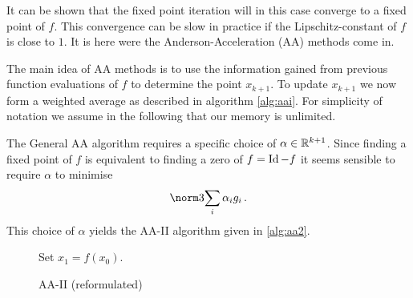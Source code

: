 It can be shown that the fixed point iteration will in this case converge to a fixed point of $f$. This convergence can be slow in practice if the Lipschitz-constant of $f$ is close to $1$. It is here were the Anderson-Acceleration (AA) methods come in.

The main idea of AA methods is to use the information gained from previous function evaluations of $f$ to determine the point $x_{k+1}$. To update $x_{k+1}$ we now form a weighted average as described in algorithm \ref{alg:aai}. For simplicity of notation we assume in the following that our memory is unlimited.

The General AA algorithm requires a specific choice of $\alpha\in\mathbb{R}^{k+1}$. Since finding a fixed point of $f$ is equivalent to finding a zero of $f=\operatorname{Id}-f$ it seems sensible to require $\alpha$ to minimise
\begin{align*}
	\norm3{\sum_i\alpha_ig_i}\,.
\end{align*}
This choice of $\alpha$ yields the AA-II algorithm given in \ref{alg:aa2}.

\begin{figure}
\centering
\begin{algorithm}[H]
\caption{AA-II (reformulated)}
\label{alg:aa2-ref}

\BlankLine
{\black Set $x_1 =f(x_0)$.}

\end{algorithm}
\end{figure}

